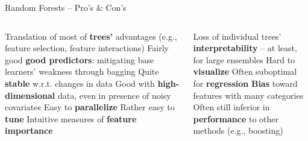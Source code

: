 \begin{frame}{Random Forests -- Pro's \& Con's}

\begin{columns}[onlytextwidth]
  \begin{column}{0.5\textwidth}
    \footnotesize
    \begin{itemize}
      \positem Translation of most of \textbf{trees'} advantages (e.g., 
      feature selection, feature interactions)
      \positem Fairly good \textbf{good predictors}: mitigating base learners' 
      weakness through bagging
      \positem Quite \textbf{stable} w.r.t. changes in data
      \positem Good with \textbf{high-dimensional} data, even in presence of 
      noisy covariates
      \positem Easy to \textbf{parallelize}
      \positem Rather easy to \textbf{tune}
      \positem Intuitive measures of \textbf{feature importance}
    \end{itemize}
  \end{column}
  \begin{column}{0.5\textwidth}
    \footnotesize
    \begin{itemize}
      \negitem Loss of individual trees' \textbf{interpretability} -- at least, 
      for large ensembles
      \negitem Hard to \textbf{visualize}
      \negitem Often suboptimal for \textbf{regression}
      \negitem \textbf{Bias} toward features with many categories
      \negitem Often still inferior in \textbf{performance} to other methods 
      (e.g., boosting)
    \end{itemize}
  \end{column}
\end{columns}

\vfill

\small


\end{frame}


